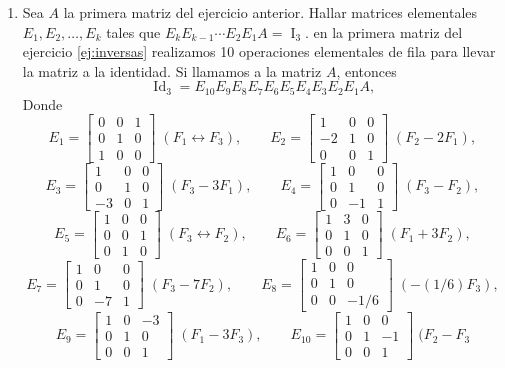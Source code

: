\begin{enumerate}[topsep=6pt,itemsep=.4cm]
\item Sea $A$ la primera matriz del ejercicio anterior.
Hallar matrices elementales $E_1,E_2,\dots,E_k$ tales que $E_kE_{k-1}\cdots E_2E_1A=\operatorname{I}_3$.
\rta en  la primera matriz del ejercicio \ref{ej:inversas} realizamos 10 operaciones elementales de fila para llevar la matriz a la identidad. Si llamamos a la matriz $A$, entonces
$$
\operatorname{Id}_3= E_{10}E_9E_8E_7E_6E_5E_4E_3E_2E_1A,
$$
Donde 
$$
    E_1 = \begin{bmatrix} 0&0&1 \\    0&1&0 \\ 1&0&0\end{bmatrix}\;(F_1 \leftrightarrow F_3) ,\qquad
    E_2 = \begin{bmatrix} 1&0&0 \\    -2&1&0 \\ 0&0&1\end{bmatrix}\; (F_2-2F_1),
$$
$$    
    E_3 = \begin{bmatrix} 1&0&0 \\    0&1&0 \\ -3&0&1\end{bmatrix}\; (F_3-3F_1),\qquad 
    E_4 = \begin{bmatrix} 1&0&0 \\    0&1&0 \\ 0&-1&1\end{bmatrix}\; (F_3-F_2),
$$
$$
    E_5 = \begin{bmatrix} 1&0&0 \\    0&0&1 \\ 0&1&0\end{bmatrix}\; (F_3 \leftrightarrow F_2),\qquad 
    E_6 = \begin{bmatrix} 1&3&0 \\    0&1&0 \\ 0&0&1\end{bmatrix}\; (F_1 +3F_2),
$$
$$
    E_7 = \begin{bmatrix} 1&0&0 \\    0&1&0 \\ 0&-7&1\end{bmatrix}\; (F_3-7F_2),\qquad 
    E_8 = \begin{bmatrix} 1&0&0 \\    0&1&0 \\ 0&0&-1/6\end{bmatrix}\; (-(1/6)F_3),
$$
$$
    E_9 = \begin{bmatrix} 1&0&-3 \\    0&1&0 \\ 0&0&1\end{bmatrix}\; (F_1-3F_3),\qquad 
    E_{10} = \begin{bmatrix} 1&0&0 \\    0&1&-1 \\ 0&0&1\end{bmatrix}\; (F_2-F_3
$$


\end{enumerate}
